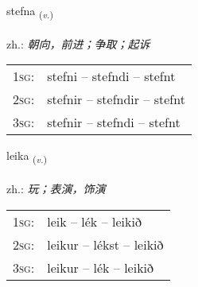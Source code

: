 \documentclass[frontgrid, backgrid]{flacards}\usepackage[]{graphicx}\usepackage[]{xcolor}
\begin{document}
\renewcommand{\flhead}{\vskip5pt \fboxsep=0pt {\small\bfseries\footnotesize Sagnorð | 动词}}
\renewcommand{\fcfoot}{\vskip5pt \fboxsep=0pt \hspace{2pt}{\small\bfseries\footnotesize 1K}}

\renewcommand{\blhead}{\vskip5pt {\small\bfseries\footnotesize Sagnorð | 动词 }}
\renewcommand{\bcfoot}{\vskip5pt \hspace{2pt}{\small\bfseries\footnotesize 1K}}


{stefna \small{\textsubscript{(\textit{v.})}} \\[1ex] %
\textphonetic{[stɛpna]} \\
zh.: \emph{朝向，前进；争取；起诉} \\  [2ex]
\renewcommand*{\arraystretch}{0.8}
\begin{tabular}{p{1cm}l}
\textsc{1sg}: & stefni -- stefndi -- stefnt \\ 
\textsc{2sg}: & stefnir -- stefndir -- stefnt \\ 
\textsc{3sg}: & stefnir -- stefndi -- stefnt \\ 
\end{tabular}
}

\renewcommand{\flhead}{\vskip5pt \fboxsep=0pt {\small\bfseries\footnotesize Sagnorð | 动词}}
\renewcommand{\fcfoot}{\vskip5pt \fboxsep=0pt \hspace{2pt}{\small\bfseries\footnotesize 1K}}

\renewcommand{\blhead}{\vskip5pt {\small\bfseries\footnotesize Sagnorð | 动词 }}
\renewcommand{\bcfoot}{\vskip5pt \hspace{2pt}{\small\bfseries\footnotesize 1K}}


{leika \small{\textsubscript{(\textit{v.})}} \\[1ex] %
\textphonetic{[leiːka]} \\
zh.: \emph{玩；表演，饰演} \\  [2ex]
\renewcommand*{\arraystretch}{0.8}
\begin{tabular}{p{1cm}l}
\textsc{1sg}: & leik -- lék -- leikið \\ 
\textsc{2sg}: & leikur -- lékst -- leikið \\ 
\textsc{3sg}: & leikur -- lék -- leikið \\ 
\end{tabular}
}
\end{document}
